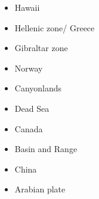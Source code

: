 \begin{itemize}
{}
\item Hawaii 
{\scriptsize
\cite{tabs09}
}
\item Hellenic zone/ Greece  
{\scriptsize
\cite{spwv88}
}
\item Gibraltar zone 
{\scriptsize
\cite{gumr02}
\cite{casv19}
} 
\item Norway 
{\scriptsize
\cite{soma13}
\cite{bubj15}
}
\item Canyonlands 
{\scriptsize
\cite{trca94}
\cite{scwa02}
\cite{grsk03}
}
\item Dead Sea 
{\scriptsize
\cite{sopg05}
}
\item Canada 
{\scriptsize
\cite{brbw93}
\cite{pelj99}
}
\item Basin and Range 
{\scriptsize
\cite{brbe89c}
}
\item China 
{\scriptsize
\cite{zhst10}
\cite{wazh15}
}
\item Arabian plate 
{\scriptsize
\cite{rerl15}
}



\end{itemize}






